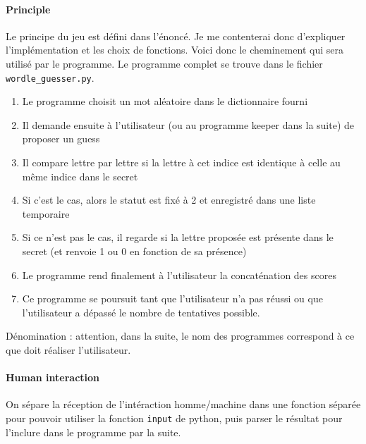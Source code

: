 \documentclass[10pt,a4paper,hidelinks]{article}
\begin{document}
\paragraph{Principle}
Le principe du jeu est défini dans l'énoncé. Je me contenterai donc d'expliquer l'implémentation et les choix de fonctions. Voici donc le cheminement qui sera utilisé par le programme. Le programme complet se trouve dans le fichier \verb|wordle_guesser.py|.
\begin{enumerate}
    \item Le programme choisit un mot aléatoire dans le dictionnaire fourni
    \item Il demande ensuite à l'utilisateur (ou au programme keeper dans la suite) de proposer un guess
    \item Il compare lettre par lettre si la lettre à cet indice est identique à celle au même indice dans le secret
    \item Si c'est le cas, alors le statut est fixé à 2 et enregistré dans une liste temporaire
    \item Si ce n'est pas le cas, il regarde si la lettre proposée est présente dans le secret (et renvoie 1 ou 0 en fonction de sa présence)
    \item Le programme rend finalement à l'utilisateur la concaténation des scores
    \item Ce programme se poursuit tant que l'utilisateur n'a pas réussi ou que l'utilisateur a dépassé le nombre de tentatives possible. 
\end{enumerate}
Dénomination : attention, dans la suite, le nom des programmes correspond à ce que doit réaliser l'utilisateur.
\paragraph{Human interaction}
On sépare la réception de l'intéraction homme/machine dans une fonction séparée pour pouvoir utiliser la fonction \verb|input| de python, puis parser le résultat pour l'inclure dans le programme par la suite.
\end{document}

